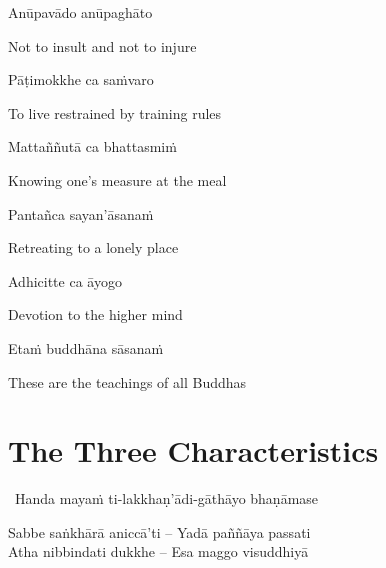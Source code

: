 Anūpavādo anūpaghāto

\begin{english}
  Not to insult and not to injure
\end{english}

Pāṭimokkhe ca saṁvaro

\begin{english}
  To live restrained by training rules
\end{english}

Mattaññutā ca bhattasmiṁ

\begin{english}
  Knowing one's measure at the meal
\end{english}

Pantañca sayan'āsanaṁ

\begin{english}
  Retreating to a lonely place
\end{english}

Adhicitte ca āyogo

\begin{english}
  Devotion to the higher mind
\end{english}

Etaṁ buddhāna sāsanaṁ

\begin{english}
  These are the teachings of all Buddhas
\end{english}

\suttaRef{[Dhp 183-185]}


\section{The Three Characteristics}
\label{three-characteristics}

\begin{leader}
  \anglebracketleft\ \hspace{-0.5mm}Handa mayaṁ ti-lakkhaṇ'ādi-gāthāyo bhaṇāmase \hspace{-0.5mm}\anglebracketright\
\end{leader}

\begin{verses}
  Sabbe saṅkhārā aniccā'ti – Yadā paññāya passati\\
  Atha nibbindati dukkhe – Esa maggo visuddhiyā
\end{verses}

